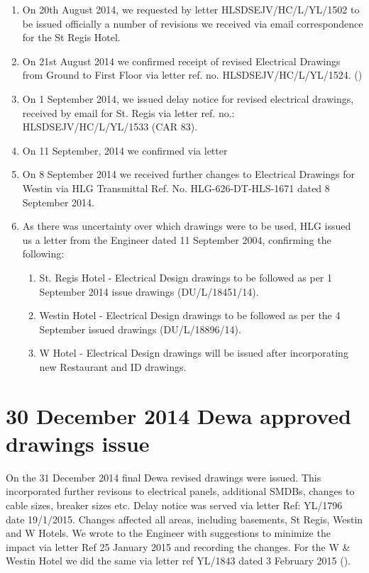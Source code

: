 \begin{enumerate}
\item On 20th August 2014, we requested by letter HLSDSEJV/HC/L/YL/1502 to be issued officially a number of revisions we received via email correspondence for the St Regis Hotel. 

\item On 21st August 2014 we confirmed receipt of revised Electrical Drawings from Ground to First Floor via letter ref. no. HLSDSEJV/HC/L/YL/1524. ()

\item On 1 September 2014, we issued delay notice for revised electrical drawings, received by email for St. Regis via letter ref. no.: HLSDSEJV/HC/L/YL/1533 (CAR 83).

\item On 11 September, 2014 we confirmed via letter 

\item On 8 September 2014 we received further changes to Electrical Drawings for Westin via HLG Transmittal Ref. No. HLG-626-DT-HLS-1671 dated 8 September 2014.

\item As there was uncertainty over which drawings were to be used, HLG issued us a letter from the Engineer dated 11 September 2004, confirming the following:

      \begin{enumerate}
    	\item  St. Regis Hotel - Electrical Design drawings to be followed as per 1 September 2014 issue drawings (DU/L/18451/14).
    	\item Westin Hotel - Electrical Design drawings to be followed as per the 4 September issued drawings (DU/L/18896/14).
    	\item W Hotel - Electrical Design drawings will be issued after incorporating new Restaurant and ID drawings.
	  \end{enumerate}
\end{enumerate}

\section{30 December 2014 Dewa approved drawings issue}
\label{electrical}

On the 31 December 2014 final Dewa revised drawings were issued. This incorporated further revisons to electrical panels, additional SMDBs, changes to cable sizes, breaker sizes etc. Delay notice was served via letter Ref: YL/1796 date 19/1/2015. Changes affected all areas, including basements, St Regis, Westin and W Hotels. We wrote to the Engineer with suggestions to minimize the impact via letter Ref 25 January 2015 and recording the changes. For the W \& Westin Hotel we did the same via letter ref YL/1843 dated 3 February 2015 ().

